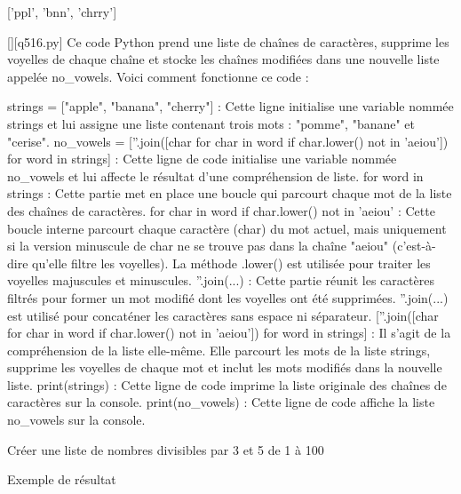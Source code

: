 ['ppl', 'bnn', 'chrry']
        \par
        \begin{solution}
            \renewcommand{\nomfichier}{q516.py}
            \pythonfile{\chemincode \nomfichier}[][\nomfichier]
            Ce code Python prend une liste de chaînes de caractères, supprime les voyelles de chaque chaîne et stocke les chaînes modifiées dans une nouvelle liste appelée no\_vowels. Voici comment fonctionne ce code :

    strings = ["apple", "banana", "cherry"] : Cette ligne initialise une variable nommée strings et lui assigne une liste contenant trois mots : "pomme", "banane" et "cerise".
    no\_vowels = [''.join([char for char in word if char.lower() not in 'aeiou']) for word in strings] : Cette ligne de code initialise une variable nommée no\_vowels et lui affecte le résultat d'une compréhension de liste.
        for word in strings : Cette partie met en place une boucle qui parcourt chaque mot de la liste des chaînes de caractères.
        for char in word if char.lower() not in 'aeiou' : Cette boucle interne parcourt chaque caractère (char) du mot actuel, mais uniquement si la version minuscule de char ne se trouve pas dans la chaîne "aeiou" (c'est-à-dire qu'elle filtre les voyelles). La méthode .lower() est utilisée pour traiter les voyelles majuscules et minuscules.
        ''.join(...) : Cette partie réunit les caractères filtrés pour former un mot modifié dont les voyelles ont été supprimées. ''.join(...) est utilisé pour concaténer les caractères sans espace ni séparateur.
        [''.join([char for char in word if char.lower() not in 'aeiou']) for word in strings] : Il s'agit de la compréhension de la liste elle-même. Elle parcourt les mots de la liste strings, supprime les voyelles de chaque mot et inclut les mots modifiés dans la nouvelle liste.
    print(strings) : Cette ligne de code imprime la liste originale des chaînes de caractères sur la console.
    print(no\_vowels) : Cette ligne de code affiche la liste no\_vowels sur la console.
        \end{solution}
        

        \question
        Créer une liste de nombres divisibles par 3 et 5 de 1 à 100

Exemple de résultat


